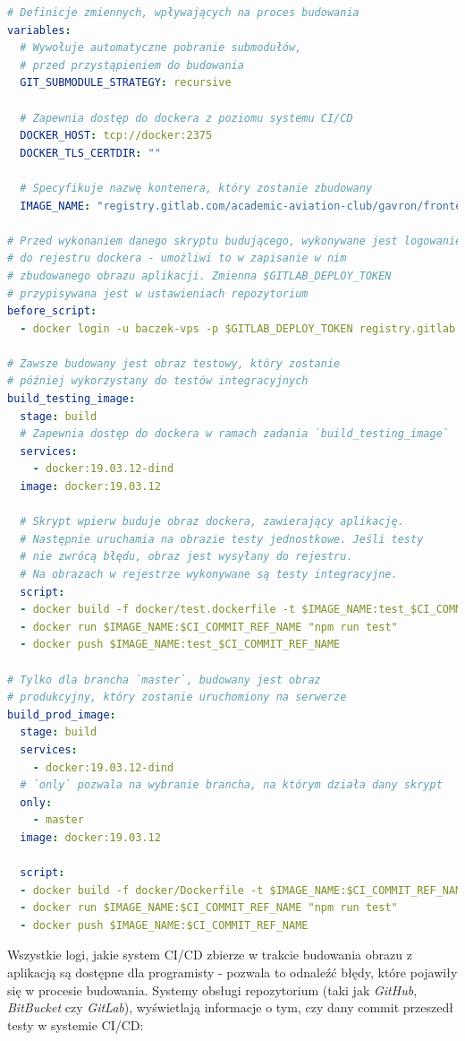 \begin{lstlisting}[language=yml, label=list:ci_cd_frontend,caption={Plik konfiguracyjny \textit{Gitlab CI}, budujący aplikację kliencką }, basicstyle=\footnotesize\ttfamily]
# Definicje zmiennych, wpływających na proces budowania
variables:
  # Wywołuje automatyczne pobranie submodułów,
  # przed przystąpieniem do budowania 
  GIT_SUBMODULE_STRATEGY: recursive
 
  # Zapewnia dostęp do dockera z poziomu systemu CI/CD
  DOCKER_HOST: tcp://docker:2375
  DOCKER_TLS_CERTDIR: "" 

  # Specyfikuje nazwę kontenera, który zostanie zbudowany 
  IMAGE_NAME: "registry.gitlab.com/academic-aviation-club/gavron/frontend"

# Przed wykonaniem danego skryptu budującego, wykonywane jest logowanie
# do rejestru dockera - umożliwi to w zapisanie w nim 
# zbudowanego obrazu aplikacji. Zmienna $GITLAB_DEPLOY_TOKEN
# przypisywana jest w ustawieniach repozytorium
before_script:
  - docker login -u baczek-vps -p $GITLAB_DEPLOY_TOKEN registry.gitlab.com

# Zawsze budowany jest obraz testowy, który zostanie
# później wykorzystany do testów integracyjnych
build_testing_image:
  stage: build
  # Zapewnia dostęp do dockera w ramach zadania `build_testing_image`
  services:
    - docker:19.03.12-dind
  image: docker:19.03.12
  
  # Skrypt wpierw buduje obraz dockera, zawierający aplikację.
  # Następnie uruchamia na obrazie testy jednostkowe. Jeśli testy
  # nie zwrócą błędu, obraz jest wysyłany do rejestru.
  # Na obrazach w rejestrze wykonywane są testy integracyjne.
  script:
  - docker build -f docker/test.dockerfile -t $IMAGE_NAME:test_$CI_COMMIT_REF_NAME .
  - docker run $IMAGE_NAME:$CI_COMMIT_REF_NAME "npm run test"
  - docker push $IMAGE_NAME:test_$CI_COMMIT_REF_NAME

# Tylko dla brancha `master`, budowany jest obraz 
# produkcyjny, który zostanie uruchomiony na serwerze
build_prod_image:
  stage: build
  services:
	- docker:19.03.12-dind	
  # `only` pozwala na wybranie brancha, na którym działa dany skrypt
  only:
    - master
  image: docker:19.03.12
   
  script:
  - docker build -f docker/Dockerfile -t $IMAGE_NAME:$CI_COMMIT_REF_NAME .
  - docker run $IMAGE_NAME:$CI_COMMIT_REF_NAME "npm run test"
  - docker push $IMAGE_NAME:$CI_COMMIT_REF_NAME
\end{lstlisting}

Wszystkie logi, jakie system CI/CD zbierze w trakcie budowania obrazu 
z aplikacją są dostępne dla programisty - pozwala to odnaleźć błędy,
które pojawiły się w procesie budowania. Systemy obsługi repozytorium
(taki jak \textit{GitHub}, \textit{BitBucket} czy \textit{GitLab}),
wyświetlają informacje o tym, czy dany commit przeszedł testy w systemie CI/CD:

